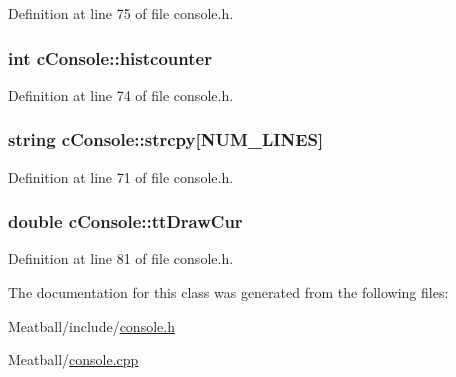 Definition at line 75 of file console.\-h.

\hypertarget{classc_console_a77c94fd7d7fbf2eaa51fe1c6c31d5d20}{
\subsubsection[{histcounter}]{\setlength{\rightskip}{0pt plus 5cm}int c\-Console\-::histcounter}}\label{classc_console_a77c94fd7d7fbf2eaa51fe1c6c31d5d20}


Definition at line 74 of file console.\-h.

\hypertarget{classc_console_a2917d66112148351d54cc8f80e1eae71}{
\subsubsection[{strcpy}]{\setlength{\rightskip}{0pt plus 5cm}string c\-Console\-::strcpy\mbox{[}{\bf N\-U\-M\-\_\-\-L\-I\-N\-E\-S}\mbox{]}}}\label{classc_console_a2917d66112148351d54cc8f80e1eae71}


Definition at line 71 of file console.\-h.

\hypertarget{classc_console_a0e75ec4d7712eefa3571bc09ced1ac32}{
\subsubsection[{tt\-Draw\-Cur}]{\setlength{\rightskip}{0pt plus 5cm}double c\-Console\-::tt\-Draw\-Cur}}\label{classc_console_a0e75ec4d7712eefa3571bc09ced1ac32}


Definition at line 81 of file console.\-h.



The documentation for this class was generated from the following files\-:\begin{DoxyCompactItemize}
\item 
Meatball/include/\hyperlink{console_8h}{console.\-h}\item 
Meatball/\hyperlink{console_8cpp}{console.\-cpp}\end{DoxyCompactItemize}
